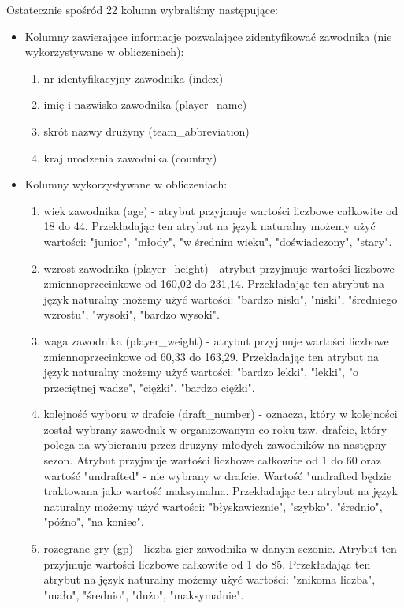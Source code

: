 \documentclass{classrep}
\begin{document}
Ostatecznie spośród 22 kolumn wybraliśmy następujące:
\begin{itemize}
    \item Kolumny zawierające informacje pozwalające zidentyfikować zawodnika (nie wykorzystywane w obliczeniach):
    \begin{enumerate}
        \item nr identyfikacyjny zawodnika (index)
        \item imię i nazwisko zawodnika (player\_name)
        \item skrót nazwy drużyny (team\_abbreviation)
        \item kraj urodzenia zawodnika (country)
    \end{enumerate}
    \item Kolumny wykorzystywane w obliczeniach:
    \begin{enumerate}
        \item wiek zawodnika (age) - atrybut przyjmuje wartości liczbowe całkowite od 18 do 44. Przekładając ten atrybut na język naturalny możemy użyć wartości: "junior", "młody", "w średnim wieku", "doświadczony", "stary". 
        \item wzrost zawodnika (player\_height) - atrybut przyjmuje wartości liczbowe zmiennoprzecinkowe od 160,02 do 231,14. Przekładając ten atrybut na język naturalny możemy użyć wartości: "bardzo niski", "niski", "średniego wzrostu", "wysoki", "bardzo wysoki".
        \item waga zawodnika (player\_weight) - atrybut przyjmuje wartości liczbowe zmiennoprzecinkowe od 60,33 do 163,29. Przekładając ten atrybut na język naturalny możemy użyć wartości: "bardzo lekki", "lekki", "o przeciętnej wadze", "ciężki", "bardzo ciężki".
        \item kolejność wyboru w drafcie (draft\_number) - oznacza, który w kolejności został wybrany zawodnik w organizowanym co roku tzw. drafcie, który polega na wybieraniu przez drużyny młodych zawodników na następny sezon. Atrybut przyjmuje wartości liczbowe całkowite od 1 do 60 oraz wartość "undrafted" - nie wybrany w drafcie. Wartość "undrafted będzie traktowana jako wartość maksymalna. Przekładając ten atrybut na język naturalny możemy użyć wartości: "błyskawicznie", "szybko", "średnio", "późno", "na koniec".
        \item rozegrane gry (gp) - liczba gier zawodnika w danym sezonie. Atrybut ten przyjmuje wartości liczbowe całkowite od 1 do 85.  Przekładając ten atrybut na język naturalny możemy użyć wartości: "znikoma liczba", "mało", "średnio", "dużo", "maksymalnie".

\end{enumerate}
\end{itemize}
\end{document}
